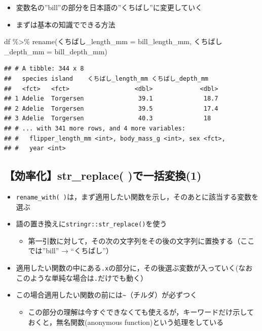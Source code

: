 \documentclass[
  xelatex,ja=standard, b5paper]{bxjsbook}
\newenvironment{Shaded}{\begin{snugshade}}{\end{snugshade}}
\newcommand{\AttributeTok}[1]{\textcolor[rgb]{0.77,0.63,0.00}{#1}}
\newcommand{\FunctionTok}[1]{\textcolor[rgb]{0.00,0.00,0.00}{#1}}
\newcommand{\NormalTok}[1]{#1}
\newcommand{\SpecialCharTok}[1]{\textcolor[rgb]{0.00,0.00,0.00}{#1}}
\providecommand{\tightlist}{%
  \setlength{\itemsep}{0pt}\setlength{\parskip}{0pt}}
\begin{document}
\begin{itemize}
\tightlist
\item
  変数名の''bill''の部分を日本語の''くちばし''に変更していく
\item
  まずは基本の知識でできる方法
\end{itemize}

\begin{Shaded}
\begin{Highlighting}[]
\NormalTok{df }\SpecialCharTok{\%\textgreater{}\%} 
  \FunctionTok{rename}\NormalTok{(くちばし}\AttributeTok{\_length\_mm =}\NormalTok{ bill\_length\_mm,}
\NormalTok{         くちばし}\AttributeTok{\_depth\_mm =}\NormalTok{ bill\_depth\_mm)}
\end{Highlighting}
\end{Shaded}

\begin{verbatim}
## # A tibble: 344 x 8
##   species island    くちばし_length_mm くちばし_depth_mm
##   <fct>   <fct>                  <dbl>             <dbl>
## 1 Adelie  Torgersen               39.1              18.7
## 2 Adelie  Torgersen               39.5              17.4
## 3 Adelie  Torgersen               40.3              18  
## # ... with 341 more rows, and 4 more variables:
## #   flipper_length_mm <int>, body_mass_g <int>, sex <fct>,
## #   year <int>
\end{verbatim}

\hypertarget{rename-strreplace1}{%
\subsection{【効率化】str\_replace( )で一括変換(1)}\label{rename-strreplace1}}

\begin{itemize}
\tightlist
\item
  \texttt{rename\_with(\ )}は，まず適用したい関数を示し，そのあとに該当する変数を選ぶ
\item
  語の置き換えに\texttt{stringr::str\_replace()}を使う

  \begin{itemize}
  \tightlist
  \item
    第一引数に対して，その次の文字列をその後の文字列に置換する（ここでは''bill'' → ``くちばし''）
  \end{itemize}
\item
  適用したい関数の中にある\texttt{.x}の部分に，その後選ぶ変数が入っていく(なおこのような単純な場合は\texttt{.}だけでも動く）
\item
  この場合適用したい関数の前には\texttt{\textasciitilde{}}（チルダ）が必ずつく

  \begin{itemize}
  \tightlist
  \item
    この部分の理解は今すぐできなくても使えるが，キーワードだけ示しておくと，無名関数(anonymous function)という処理をしている
  \end{itemize}
\end{itemize}
\end{document}
